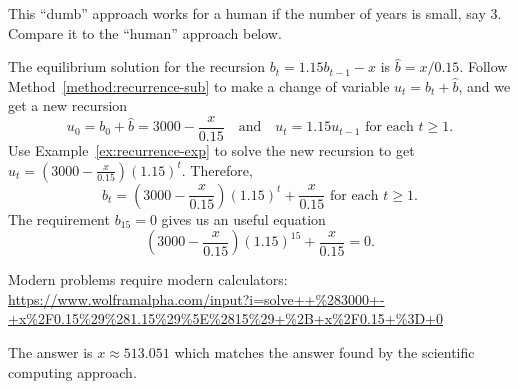 \documentclass[../main.tex]{subfiles}
\begin{document}
This ``dumb'' approach works for a human if the number of years is small, say \(3\). Compare it to the ``human'' approach below.  

The equilibrium solution for the recursion \(b_{t} = 1.15 b_{t-1} - x\) is \(\hat{b} = x/0.15\). Follow Method~\ref{method:recurrence-sub} to make a change of variable \(u_{t} = b_{t} + \hat{b}\), and we get a new recursion
\[
  u_{0} = b_{0} + \hat{b} = 3000 - \frac{x}{0.15} \quad\text{and}\quad u_{t} = 1.15 u_{t-1} \text{ for each } t \ge 1.
\]
Use Example~\ref{ex:recurrence-exp} to solve the new recursion to get \(u_{t} = \left(3000 - \frac{x}{0.15}\right)(1.15)^{t}\). Therefore, 
\[
  b_{t} = \left(3000 - \frac{x}{0.15}\right)(1.15)^{t} + \frac{x}{0.15} \text{ for each } t \ge 1.
\]
The requirement \(b_{15} = 0\) gives us an useful equation
\[
  \left(3000 - \frac{x}{0.15}\right)(1.15)^{15} + \frac{x}{0.15} = 0.
\]

Modern problems require modern calculators:
\url{https://www.wolframalpha.com/input?i=solve++%283000+-+x%2F0.15%29%281.15%29%5E%2815%29+%2B+x%2F0.15+%3D+0}

The answer is \( x \approx 513.051 \) which matches the answer found by the scientific computing approach.
\end{document}
